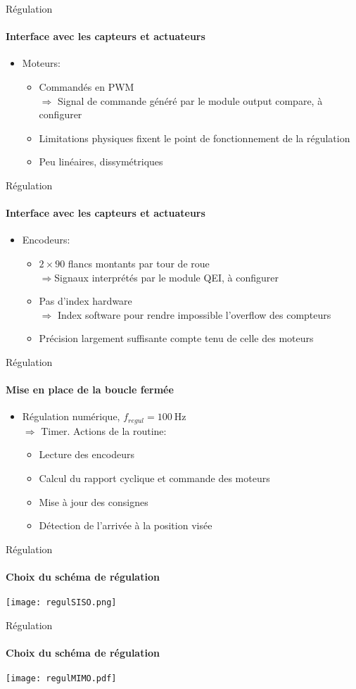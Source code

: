 \begin{frame}
  \tableofcontents[currentsection]
\end{frame}

\begin{frame}{Régulation}
\framesubtitle{Interface avec les capteurs et actuateurs}
\begin{itemize}
  \item Moteurs:
  \begin{itemize}
  \item Commandés en PWM\\
  $\Rightarrow$ Signal de commande généré par le module output compare, à configurer
  \item Limitations physiques fixent le point de fonctionnement de la régulation
  \item Peu linéaires, dissymétriques
  \end{itemize}
\end{itemize}
\end{frame}

\begin{frame}{Régulation}
\framesubtitle{Interface avec les capteurs et actuateurs}
\begin{itemize}
  \item Encodeurs:
  \begin{itemize}
    \item $2\times90$ flancs montants par tour de roue\\
    $\Rightarrow$Signaux interprétés par le module QEI, à configurer
    \item Pas d'index hardware\\
    $\Rightarrow$ Index software pour rendre impossible l'overflow des compteurs
    \item Précision largement suffisante compte tenu de celle des moteurs
  \end{itemize}
\end{itemize}
\end{frame}

\begin{frame}{Régulation}
\framesubtitle{Mise en place de la boucle fermée}
\begin{itemize}
  \item Régulation numérique, $f_{regul} = \SI{100}{\hertz}$\\
  $\Rightarrow$ Timer. Actions de la routine:
  \begin{itemize}
    \item Lecture des encodeurs
    \item Calcul du rapport cyclique et commande des moteurs
    \item Mise à jour des consignes
    \item Détection de l'arrivée à la position visée
  \end{itemize}
\end{itemize}
\end{frame}

\begin{frame}{Régulation}
\framesubtitle{Choix du schéma de régulation}
\texttt{[image: regulSISO.png]}
\end{frame}

\begin{frame}{Régulation}
\framesubtitle{Choix du schéma de régulation}
\texttt{[image: regulMIMO.pdf]}
\end{frame}
